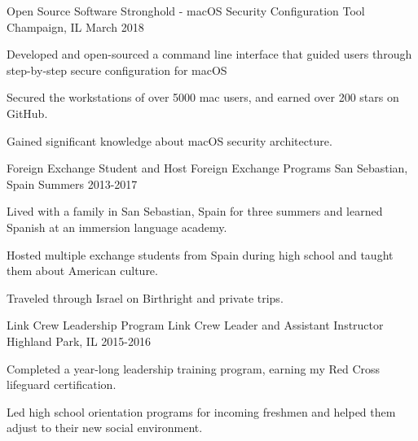 

\begin{cventries}
\cventry
{Open Source Software} %
{Stronghold - macOS Security Configuration Tool} %
{Champaign, IL} %
{March 2018} %
{
	\begin{cvitems} %
		\item {Developed and open-sourced a command line interface that guided users through step-by-step secure configuration for macOS}
		\item {Secured the workstations of over 5000 mac users, and earned over 200 stars on GitHub.}
		\item{Gained significant knowledge about macOS security architecture.} 
	\end{cvitems}
}
\cventry
{Foreign Exchange Student and Host} %
{Foreign Exchange Programs} %
{San Sebastian, Spain} %
{Summers 2013-2017} %
{
	\begin{cvitems} %
		\item {Lived with a family in San Sebastian, Spain for three summers and learned Spanish at an immersion language academy.}
		\item {Hosted multiple exchange students from Spain during high school and taught them about American culture.}
		\item {Traveled through Israel on Birthright and private trips.}
	\end{cvitems}
}
\cventry
{Link Crew Leadership Program} %
{Link Crew Leader and Assistant Instructor} %
{Highland Park, IL} %
{2015-2016} %
{
   \begin{cvitems} %
        \item {Completed a year-long leadership training program, earning my Red Cross lifeguard certification.}
        \item {Led high school orientation programs for incoming freshmen and helped them adjust to their new social environment.}
   \end{cvitems}
} 
\end{cventries}

